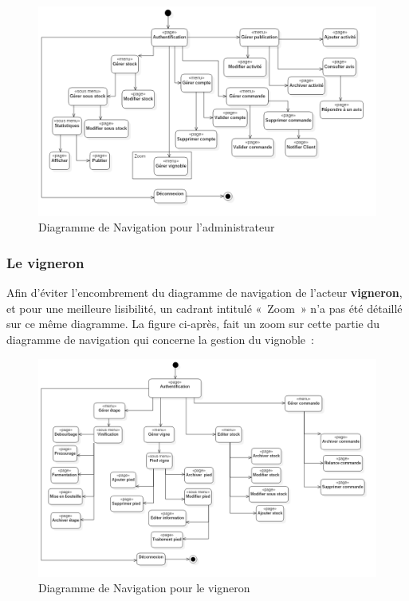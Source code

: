 \documentclass[a4paper, titlepage]{report}
\let\oldparagraph\subsubsection
\renewcommand{\subsubsection}[1]{\oldparagraph{#1}\mbox{}}
\begin{document}
\begin{figure}[!h]
\centering
\includegraphics{Images/ArboAdmin.png}
\caption{Diagramme de Navigation pour l'administrateur}
\end{figure}

\subsubsection{Le vigneron}

Afin d'éviter l'encombrement du diagramme de navigation de l'acteur
\textbf{vigneron}, et pour une meilleure lisibilité, un cadrant intitulé «~Zoom~»
n'a pas été détaillé sur ce même diagramme. La figure ci-après, fait un
zoom sur cette partie du diagramme de navigation qui concerne la gestion
du vignoble~:

\begin{figure}[!h]
\centering
\includegraphics{Images/ArboVigneron.png}
\caption{Diagramme de Navigation pour le vigneron}
\end{figure}
\end{document}
